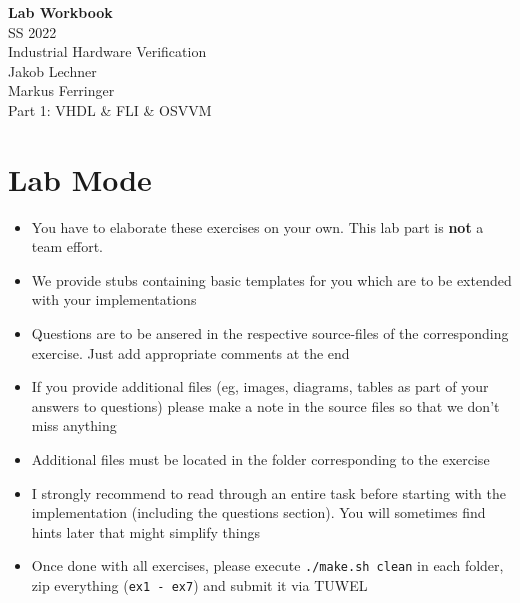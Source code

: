 \documentclass[12pt,epsf,makeidx,oneside]{book}
\begin{document}

\setcounter{tocdepth}{3}
\setcounter{secnumdepth}{3}

\begin{titlepage}
  \begin{center}
    \vspace*{4cm}
    \Huge{\bf Lab Workbook}\\
    \Large{SS 2022}\\
    \vspace{1.5cm}
    \Huge{Industrial Hardware Verification}\\
    \vspace{3cm}
    \Large{
      Jakob Lechner \\
      Markus Ferringer \\
    }
    \vspace*{3cm}
    \Huge{
      Part 1: VHDL \& FLI \& OSVVM
    }
  \end{center}
\end{titlepage}

\tableofcontents

\chapter*{Lab Mode}
\begin{itemize}[noitemsep]
  \item You have to elaborate these exercises on your own. This lab part is {\bf not} a team effort.
  \item We provide stubs containing basic templates for you which are to be extended with your implementations
  \item Questions are to be ansered in the respective source-files of the corresponding exercise. Just add appropriate comments at the end
  \item If you provide additional files (eg, images, diagrams, tables as part of your answers to questions) please make a note in the source files so that we don't miss anything
  \item Additional files must be located in the folder corresponding to the exercise
  \item I strongly recommend to read through an entire task before starting with the implementation (including the questions section). You will sometimes find hints later that might simplify things
  \item Once done with all exercises, please execute {\tt ./make.sh clean} in each folder, zip everything ({\tt ex1 - ex7}) and submit it via TUWEL
\end{itemize}
\end{document}
